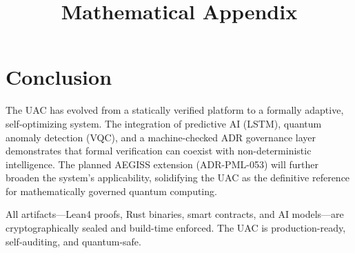 \documentclass[11pt,a4paper]{article}
\begin{document}
\section{Conclusion}

The UAC has evolved from a statically verified platform to a formally adaptive, self-optimizing system. The integration of predictive AI (LSTM), quantum anomaly detection (VQC), and a machine-checked ADR governance layer demonstrates that formal verification can coexist with non-deterministic intelligence. The planned AEGISS extension (ADR-PML-053) will further broaden the system's applicability, solidifying the UAC as the definitive reference for mathematically governed quantum computing.

All artifacts—Lean4 proofs, Rust binaries, smart contracts, and AI models—are cryptographically sealed and build-time enforced. The UAC is production-ready, self-auditing, and quantum-safe.




\title{Mathematical Appendix}
\date{}
\end{document}
